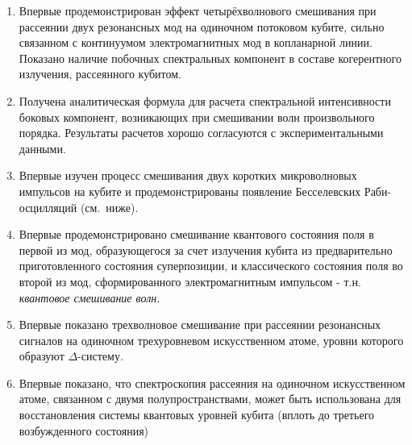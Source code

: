 {\novelty}
\begin{enumerate}
  \item Впервые продемонстрирован эффект четырёхволнового смешивания при рассеянии двух резонансных мод на одиночном потоковом кубите, сильно связанном с континуумом электромагнитных мод в копланарной линии. Показано наличие побочных спектральных компонент в составе когерентного излучения, рассеянного кубитом. 
  \item Получена аналитическая формула для расчета спектральной интенсивности боковых компонент, возникающих при смешивании волн произвольного порядка. Результаты расчетов хорошо согласуются с экспериментальными данными. 
  \item Впервые изучен процесс смешивания двух коротких микроволновых импульсов на кубите и продемонстрированы  появление Бесселевских Раби-осцилляций (см.~ниже).
  \item Впервые продемонстрировано смешивание квантового состояния поля в первой из мод, образующегося за счет излучения кубита из предварительно приготовленного состояния суперпозиции, и классического состояния поля во второй из мод, сформированного электромагнитным импульсом - т.н. \textit{квантовое смешивание волн}.
  \item Впервые показано трехволновое смешивание при рассеянии резонансных сигналов на одиночном трехуровневом искусственном атоме, уровни которого образуют $\Delta$-систему.
  \item Впервые показано, что спектроскопия рассеяния на одиночном искусственном атоме, связанном с двумя полупространствами, может быть использована для восстановления системы квантовых уровней кубита (вплоть до третьего возбужденного состояния)
\end{enumerate}


